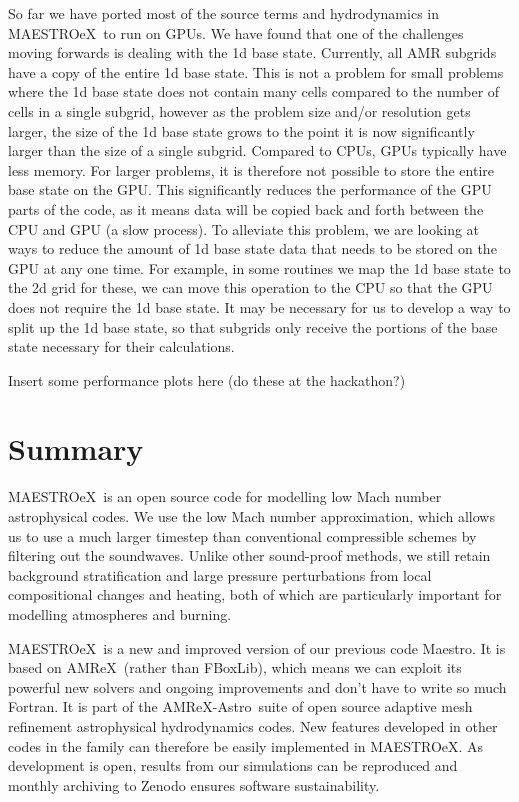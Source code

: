 \documentclass[a4paper]{jpconf}
\newcommand{\maestro}{{\sffamily Maestro}}
\newcommand{\maestroex}{{\sffamily MAESTROeX}}
\newcommand{\amrex}{{\sffamily AMReX}}
\newcommand{\amrexastro}{{\sffamily AMReX-Astro}}
\newcommand{\fboxlib}{{\sffamily FBoxLib}}
\begin{document}
So far we have ported most of the source terms and hydrodynamics in \maestroex~to run on GPUs. We have found that one of the challenges moving forwards is dealing with the 1d base state. Currently, all AMR subgrids have a copy of the entire 1d base state. This is not a problem for small problems where the 1d base state does not contain many cells compared to the number of cells in a single subgrid, however as the problem size and/or resolution gets larger, the size of the 1d base state grows to the point it is now significantly larger than the size of a single subgrid. Compared to CPUs, GPUs typically have less memory. For larger problems, it is therefore not possible to store the entire base state on the GPU. This significantly reduces the performance of the GPU parts of the code, as it means data will be copied back and forth between the CPU and GPU (a slow process). To alleviate this problem, we are looking at ways to reduce the amount of 1d base state data that needs to be stored on the GPU at any one time. For example, in some routines we map the 1d base state to the 2d grid \textendash for these, we can move this operation to the CPU so that the GPU does not require the 1d base state. It may be necessary for us to develop a way to split up the 1d base state, so that subgrids only receive the portions of the base state necessary for their calculations. 

Insert some performance plots here (do these at the hackathon?)


\section{Summary} \label{sec:summary}

\maestroex~is an open source code for modelling low Mach number astrophysical codes. We use the low Mach number approximation, which allows us to use a much larger timestep than conventional compressible schemes by filtering out the soundwaves. Unlike other sound-proof methods, we still retain background stratification and large pressure perturbations from local compositional changes and heating, both of which are particularly important for modelling atmospheres and burning. 

\maestroex~is a new and improved version of our previous code \maestro. It is based on \amrex~(rather than \fboxlib), which means we can exploit its powerful new solvers and ongoing improvements and don't have to write so much Fortran. It is part of the \amrexastro~suite of open source adaptive mesh refinement astrophysical hydrodynamics codes. New features developed in other codes in the family can therefore be easily implemented in \maestroex. As development is open, results from our simulations can be reproduced and monthly archiving to Zenodo ensures software sustainability.
\end{document}
